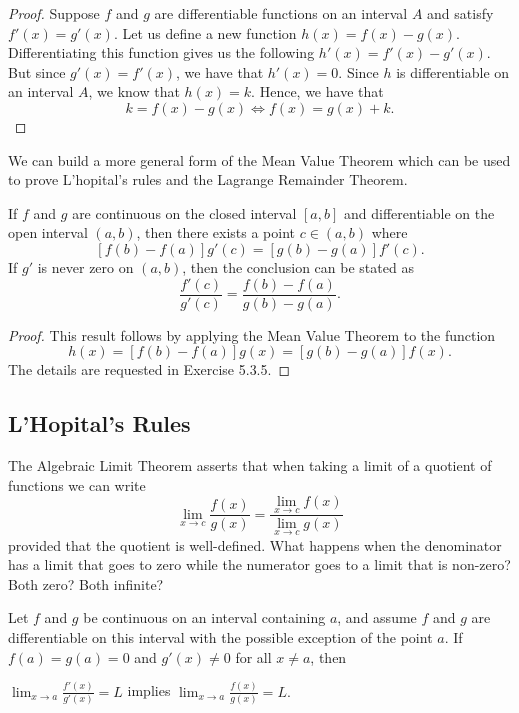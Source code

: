 \begin{proof}
Suppose \( f \) and \( g  \) are differentiable functions on an interval \( A  \) and satisfy \( f'(x) = g'(x)  \). Let us define a new function \( h(x) = f(x) - g(x)  \). Differentiating this function gives us the following \( h'(x) = f'(x) - g'(x)  \). But since \( g'(x) = f'(x)  \), we have that \( h'(x) = 0  \). Since \( h  \) is differentiable on an interval \( A  \), we know that \( h(x) = k  \). Hence, we have that 
\[  k = f(x) - g(x) \iff f(x) = g(x) + k. \]
\end{proof}

We can build a more general form of the Mean Value Theorem which can be used to prove L'hopital's rules and the Lagrange Remainder Theorem.

\begin{theorem}
    If \( f  \) and \( g  \) are continuous on the closed interval \( [a,b]  \) and differentiable on the open interval \( (a,b)  \), then there exists a point \( c \in (a,b)  \) where 
    \[  [f(b) -f(a)]g'(c) = [g(b) -g(a)]f'(c). \]
    If \( g'  \) is never zero on \( (a,b)  \), then the conclusion can be stated as 
    \[  \frac{ f'(c)  }{ g'(c)  } = \frac{ f(b) - f(a)  }{ g(b) - g(a)  }. \]
    \end{theorem}

\begin{proof}
This result follows by applying the Mean Value Theorem to the function 
\[  h(x) = [f(b) - f(a)] g(x) = [g(b) - g(a)] f(x).  \]
The details are requested in Exercise 5.3.5.
\end{proof}

\subsection{L'Hopital's Rules}

The Algebraic Limit Theorem asserts that when taking a limit of a quotient of functions we can write 
\[  \lim_{ x \to c  } \frac{ f(x)  }{ g(x)  } = \frac{ \lim_{ x \to c  } f(x)  }{ \lim_{ x \to c  } g(x)  }  \]
provided that the quotient is well-defined. What happens when the denominator has a limit that goes to zero while the numerator goes to a limit that is non-zero? Both zero? Both infinite?

\begin{theorem}
    Let \( f  \) and \( g  \) be continuous on an interval containing \( a  \), and assume \( f  \) and \( g  \) are differentiable on this interval with the possible exception of the point \( a  \). If \( f(a) = g(a) = 0  \) and \( g'(x) \neq 0  \) for all \( x \neq a  \), then 
    \begin{center}
        \( \lim_{ x \to a } \frac{ f'(x)  }{ g'(x)  } = L  \) implies \( \lim_{ x \to a } \frac{ f(x)  }{ g(x)  } = L. \)
    \end{center}
    \end{theorem}

